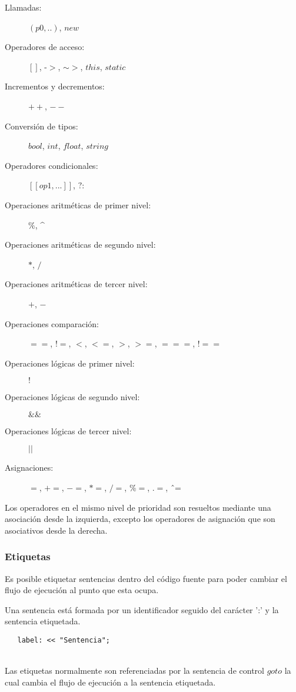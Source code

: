 \begin{description}
\item [Llamadas:] $(p0,..)$, $new$
\item [Operadores de acceso:] $[]$, -$>$, $\sim>$, $this$, $static$
\item [Incrementos y decrementos:] $++$, $--$
\item [Conversión de tipos:] $bool$, $int$, $float$, $string$
\item [Operadores condicionales:] $[[op1,...]]$, $?:$
\item [Operaciones aritméticas de primer nivel:] $\%$, \^ \hfill  
\item [Operaciones aritméticas de segundo nivel:] $*$, $/$
\item [Operaciones aritméticas de tercer nivel:] $+$, $-$
\item [Operaciones comparación:] $==$, $!=$, $<$, $<=$, $>$, $>=$, $===$, $!==$
\item [Operaciones lógicas de primer nivel:] $!$
\item [Operaciones lógicas de segundo nivel:] $\&\&$
\item [Operaciones lógicas de tercer nivel:] $||$
\item [Asignaciones:] $=$, $+=$, $-=$, $*=$, $/=$, $\%=$, $.=$, \^ \ =\hfill 
\end{description} 

Los operadores en el mismo nivel de prioridad son resueltos mediante una asociación desde la izquierda, excepto los operadores de asignación que son asociativos desde la derecha.

\subsubsection{Etiquetas} \label{sec:label}
Es posible etiquetar sentencias dentro del código fuente para poder cambiar el flujo de ejecución al punto que esta ocupa.

Una sentencia está formada por un identificador seguido del carácter ':' y la sentencia etiquetada.\\

\begin{lstlisting}
   label: << "Sentencia";
\end{lstlisting}
\hfill\\

Las etiquetas normalmente son referenciadas por la sentencia de control $goto$ la cual cambia el flujo de ejecución 
a la sentencia etiquetada. 

